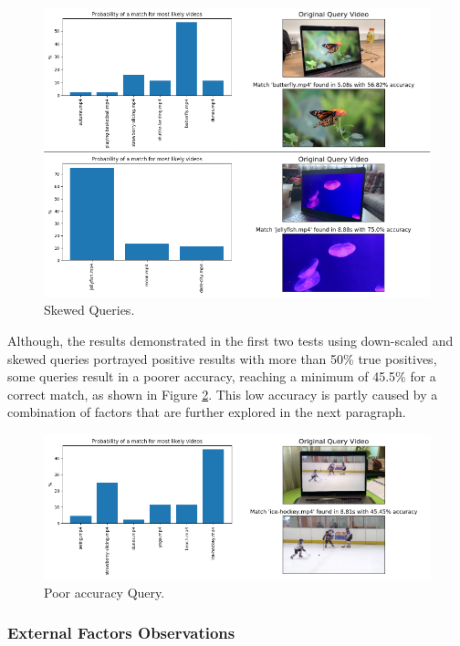 \begin{figure}[h] 
\centerline{\includegraphics[width=\textwidth]{figures/evaluation/skewed-queries.png}}
\caption{\label{fig:evaluation-skewed-queries}Skewed Queries.}
\end{figure}

Although, the results demonstrated in the first two tests using down-scaled and skewed queries portrayed positive results with more than 50\% true positives, some queries result in a poorer accuracy, reaching a minimum of 45.5\% for a correct match, as shown in Figure \ref{fig:evaluation-poor-accuracy-query}. This low accuracy is partly caused by a combination of factors that are further explored in the next paragraph. %

\begin{figure}[h] 
\centerline{\includegraphics[width=\textwidth]{figures/evaluation/poor-accuracy-query.png}}
\caption{\label{fig:evaluation-poor-accuracy-query}Poor accuracy Query.}
\end{figure}


\subsubsection{External Factors Observations}
\label{sec:evaluation-observations-online-phase}

